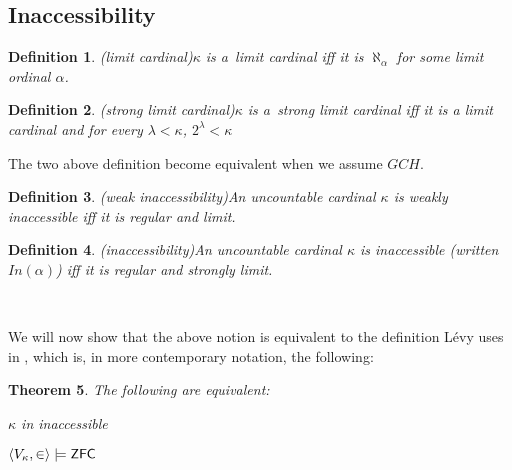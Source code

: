 \documentclass[12pt,a4paper]{article}
\newtheorem{theorem}{Theorem}[section]
\newtheorem{definition}[theorem]{Definition}
\newcommand{\sub}{\subseteq}
\newcommand{\bce}{\begin{compactenum}}
\newcommand{\ece}{\end{compactenum}}
\begin{document}



\subsection{Inaccessibility}\label{section:inaccessibility}
\begin{definition}{(limit cardinal)}\label{def:limit}
$\kappa$ is a~\emph{limit cardinal} iff it is $\aleph_\alpha$ for some limit ordinal $\alpha$.
\end{definition}

\begin{definition}{(strong limit cardinal)}\label{def:strong_limit}
$\kappa$ is a~\emph{strong limit cardinal} iff it is a limit cardinal and for every $\lambda < \kappa$, $2^\lambda < \kappa$
\end{definition}

The two above definition become equivalent when we assume $GCH$.

\begin{definition}{(weak inaccessibility)}\label{def:weakly_inaccessible}
An uncountable cardinal $\kappa$ is \emph{weakly inaccessible} iff it is \emph{regular} and \emph{limit}.
\end{definition}
\begin{definition}(inaccessibility)\label{def:inaccessible}
An uncountable cardinal $\kappa$ is \emph{inaccessible} (written $In(\alpha)$) iff it is \emph{regular} and \emph{strongly limit}.
\end{definition}

\

We will now show that the above notion is equivalent to the definition Lévy uses in \cite{Levy60a}, which is, in more contemporary notation, the following:
\begin{theorem}\label{theorem:inaccessible_models_zfc}
The following are equivalent:
\bce
\item $\kappa$ in inaccessible
\item $\langle V_\kappa, \in \rangle \models \sf{ZFC}$
\ece
\end{theorem}
\end{document}
